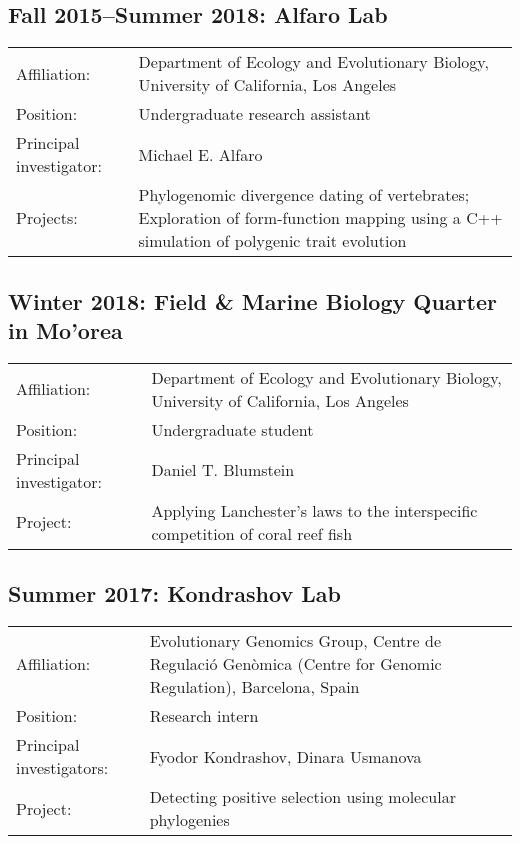 \documentclass[10pt]{article}
\begin{document}
\subsection*{Fall 2015--Summer 2018: Alfaro Lab}

\begin{tabularx}{\textwidth}{>{\raggedleft\arraybackslash}p{3.6cm} X}
Affiliation: & Department of Ecology and Evolutionary Biology, University of California, Los Angeles \\[0.1cm]
Position: & Undergraduate research assistant \\[0.1cm]
Principal investigator: & Michael E. Alfaro \\[0.1cm]
Projects: & Phylogenomic divergence dating of vertebrates; Exploration of form-function mapping using a \textsf{C++} simulation of polygenic trait evolution
\end{tabularx}

\subsection*{Winter 2018: Field \& Marine Biology Quarter in Mo'orea}

\begin{tabularx}{\textwidth}{>{\raggedleft\arraybackslash}p{3.6cm} X}
Affiliation: & Department of Ecology and Evolutionary Biology, University of California, Los Angeles \\[0.1cm]
Position: & Undergraduate student \\[0.1cm]
Principal investigator: & Daniel T. Blumstein \\[0.1cm]
Project: & Applying Lanchester's laws to the interspecific competition of coral reef fish
\end{tabularx}

\subsection*{Summer 2017: Kondrashov Lab}

\begin{tabularx}{\textwidth}{>{\raggedleft\arraybackslash}p{3.6cm} X}
Affiliation: & Evolutionary Genomics Group, Centre de Regulaci\'{o} Gen\`{o}mica (Centre for Genomic Regulation), Barcelona, Spain \\[0.1cm]
Position: & Research intern \\[0.1cm]
Principal investigators: & Fyodor Kondrashov, Dinara Usmanova \\[0.1cm]
Project: & Detecting positive selection using molecular phylogenies \\[0.1cm]
\end{tabularx}
\end{document}
